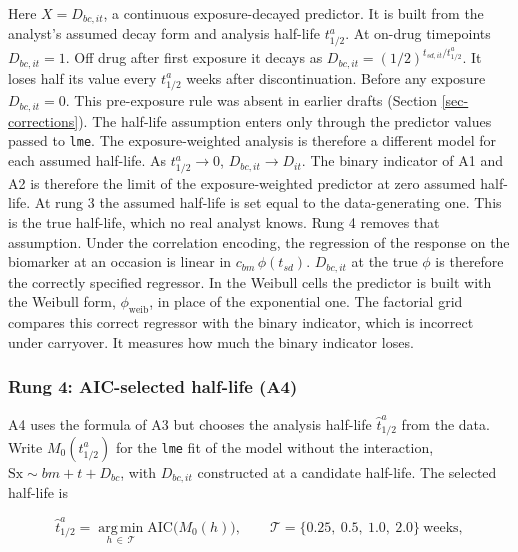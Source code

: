 \documentclass[
  11pt,
]{article}
\begin{document}
Here \(X = D_{bc,it}\), a continuous exposure-decayed predictor. It
is built from the analyst's assumed decay form and analysis
half-life \(t^{a}_{1/2}\). At on-drug timepoints \(D_{bc,it} = 1\). Off
drug after first exposure it decays as \(D_{bc,it} =
(1/2)^{t_{sd,it}/t^{a}_{1/2}}\). It loses half its value every
\(t^{a}_{1/2}\) weeks after discontinuation. Before any exposure
\(D_{bc,it} = 0\). This pre-exposure rule was absent in earlier drafts
(Section \ref{sec-corrections}). The half-life assumption enters only
through the predictor values passed to \texttt{lme}. The exposure-weighted
analysis is therefore a different model for each assumed half-life.
As \(t^{a}_{1/2} \rightarrow 0\), \(D_{bc,it} \rightarrow D_{it}\). The
binary indicator of A1 and A2 is therefore the limit of the
exposure-weighted predictor at zero assumed half-life. At rung 3 the
assumed half-life is set equal to the data-generating one. This is
the true half-life,
which no real analyst knows. Rung 4 removes that assumption. Under
the correlation encoding, the regression of the response on the
biomarker at an occasion is linear in \(c_{bm}\,\phi(t_{sd})\).
\(D_{bc,it}\) at the true \(\phi\) is therefore the correctly specified
regressor. In the Weibull cells the predictor is built with the
Weibull form, \(\phi_{\text{weib}}\), in place of the exponential one.
The factorial grid compares this correct regressor with the binary
indicator, which is incorrect under carryover. It measures how much
the binary indicator loses.

\subsubsection{Rung 4: AIC-selected half-life (A4)}\label{sec-g4}

A4 uses the formula of A3 but chooses the analysis half-life
\(\hat{t}^{a}_{1/2}\) from the data. Write
\(M_0(t^{a}_{1/2})\) for the \texttt{lme} fit of the model without the
interaction, \(\text{Sx} \sim bm + t + D_{bc}\), with \(D_{bc,it}\)
constructed at a candidate half-life. The selected half-life is

\[\hat{t}^{a}_{1/2} = \operatorname*{arg\,min}_{h \,\in\, \mathcal{T}}
  \text{AIC}\big(M_0(h)\big), \qquad
  \mathcal{T} = \{0.25,\ 0.5,\ 1.0,\ 2.0\}\ \text{weeks},\]
\end{document}
